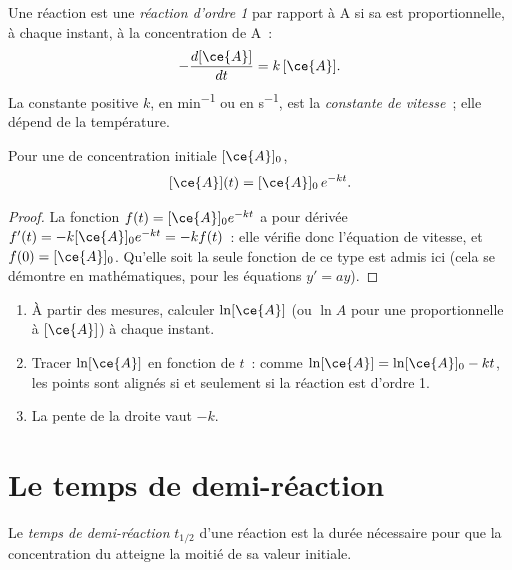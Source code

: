\begin{definition}\label{def:g12:reaction-rates:first-order}
Une réaction est une \emph{réaction d'ordre 1}
par rapport à A si sa  est proportionnelle, à
chaque instant, à la concentration de A~:
\[
  -\frac{d[\ce{A}]}{dt} = k\,[\ce{A}] .
\]
La constante positive $k$, en \si{min^{-1}} ou en \si{s^{-1}}, est la
\emph{constante de vitesse}~; elle dépend de
la température.
\end{definition}

\begin{proposition}\label{prop:g12:reaction-rates:exponential}
Pour une  de concentration initiale $[\ce{A}]_0$,
\[
  [\ce{A}](t) = [\ce{A}]_0\, e^{-kt} .
\]
\end{proposition}

\begin{proof}
La fonction $f(t) = [\ce{A}]_0 e^{-kt}$ a pour dérivée
$f'(t) = -k [\ce{A}]_0 e^{-kt} = -k f(t)$~: elle vérifie donc l'équation
de vitesse, et $f(0) = [\ce{A}]_0$. Qu'elle soit la seule fonction de ce
type est admis ici (cela se démontre en mathématiques, pour les
équations $y' = ay$).
\end{proof}

\begin{method}\label{met:g12:reaction-rates:test}
\begin{enumerate}
  \item À partir des mesures, calculer $\ln [\ce{A}]$ (ou $\ln A$ pour
        une  proportionnelle à $[\ce{A}]$) à chaque instant.
  \item Tracer $\ln[\ce{A}]$ en fonction de $t$~: comme
        $\ln[\ce{A}] = \ln[\ce{A}]_0 - kt$, les points sont alignés si et
        seulement si la réaction est d'ordre 1.
  \item La pente de la droite vaut $-k$.
\end{enumerate}
\end{method}

\section{Le temps de demi-réaction}

\begin{definition}\label{def:g12:reaction-rates:half-life}
Le \emph{temps de demi-réaction} $t_{1/2}$
d'une réaction est la durée nécessaire pour que la concentration du
 atteigne la moitié de sa valeur initiale.
\end{definition}

